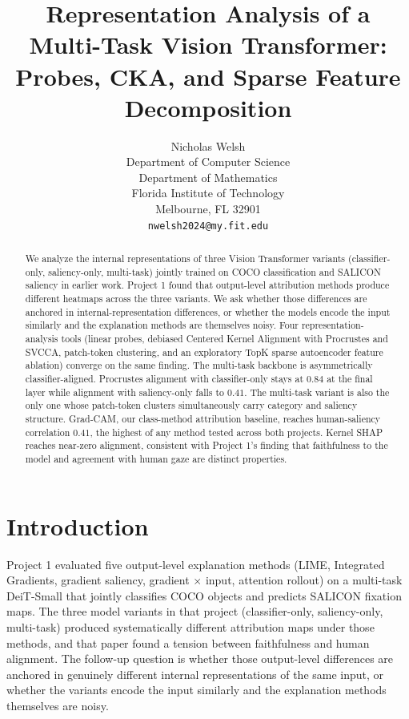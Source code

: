 \documentclass{article}
\title{Representation Analysis of a Multi-Task Vision Transformer:\\Probes, CKA, and Sparse Feature Decomposition}
\author{%
 Nicholas Welsh \\
  Department of Computer Science\\
  Department of Mathematics \\
  Florida Institute of Technology\\
  Melbourne, FL 32901 \\
  \texttt{nwelsh2024@my.fit.edu}
}
\begin{document}
\maketitle

\begin{abstract}
We analyze the internal representations of three Vision Transformer variants (classifier-only, saliency-only, multi-task) jointly trained on COCO classification and SALICON saliency in earlier work. Project 1 found that output-level attribution methods produce different heatmaps across the three variants. We ask whether those differences are anchored in internal-representation differences, or whether the models encode the input similarly and the explanation methods are themselves noisy. Four representation-analysis tools (linear probes, debiased Centered Kernel Alignment with Procrustes and SVCCA, patch-token clustering, and an exploratory TopK sparse autoencoder feature ablation) converge on the same finding. The multi-task backbone is asymmetrically classifier-aligned. Procrustes alignment with classifier-only stays at $0.84$ at the final layer while alignment with saliency-only falls to $0.41$. The multi-task variant is also the only one whose patch-token clusters simultaneously carry category and saliency structure. Grad-CAM, our class-method attribution baseline, reaches human-saliency correlation $0.41$, the highest of any method tested across both projects. Kernel SHAP reaches near-zero alignment, consistent with Project 1's finding that faithfulness to the model and agreement with human gaze are distinct properties.
\end{abstract}

\section{Introduction}

Project 1 evaluated five output-level explanation methods (LIME, Integrated Gradients, gradient saliency, gradient $\times$ input, attention rollout) on a multi-task DeiT-Small that jointly classifies COCO objects and predicts SALICON fixation maps. The three model variants in that project (classifier-only, saliency-only, multi-task) produced systematically different attribution maps under those methods, and that paper found a tension between faithfulness and human alignment. The follow-up question is whether those output-level differences are anchored in genuinely different internal representations of the same input, or whether the variants encode the input similarly and the explanation methods themselves are noisy.
\end{document}
